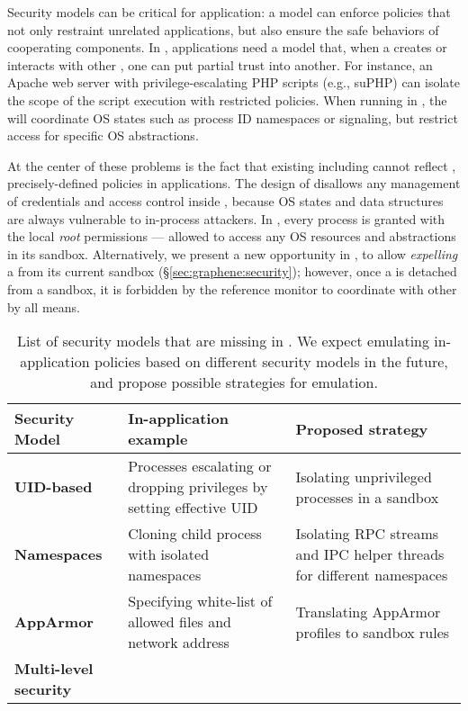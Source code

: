 Security models can be critical for application:
a model can enforce policies that not only restraint unrelated applications,
but also ensure the safe behaviors of cooperating components.
In \liboses{}, applications need a model that,
when a \picoproc{} creates or interacts with other \picoprocs{},
one can put partial trust into another.
For instance,
an Apache web server with privilege-escalating PHP scripts (e.g., suPHP)
can isolate the scope of
the script execution
with restricted policies.
When running in \graphene{},
the \picoprocs{} will coordinate OS states such as process ID namespaces or signaling,
but restrict access for specific OS abstractions. 




At the center of these problems is the fact that existing \liboses{} including \graphene{}
cannot reflect ,
precisely-defined policies in applications.
The design of \picoprocs{} disallows any management of credentials and access control inside \liboses{},
because OS states and data structures are always
vulnerable to in-process attackers. %
In \graphene{}, every process is granted with the local \emph{root} permissions
--- allowed to access any OS resources and abstractions
in its sandbox.
Alternatively, we present a new opportunity in \graphene{},
to allow \emph{expelling} a \picoproc{} from its current sandbox (\S\ref{sec:graphene:security});
however, once a \picoproc{} is detached from a sandbox,
it is forbidden by the reference monitor to coordinate with other \picoprocs{}
by all means.


\begin{table}[t]
\footnotesize
\centering
\begin{tabular}{>{\bf}p{1.2in}>{\raggedright\arraybackslash}p{2.4in}>{\raggedright\arraybackslash}p{2.4in}}
\toprule
{\bf Security Model} & {\bf In-application example} & {\bf Proposed strategy} \\
\midrule
UID-based & Processes escalating or dropping privileges by setting effective UID & Isolating unprivileged processes in a sandbox \\
\midrule
Namespaces & Cloning child process with isolated namespaces & Isolating RPC streams and IPC helper threads for different namespaces \\
\midrule
AppArmor & Specifying white-list of allowed files and network address & Translating AppArmor profiles to sandbox rules \\
\midrule
Multi-level security &  &  \\
\bottomrule
\end{tabular}
\caption[List of security models to be added in \graphene{} as future works]
{List of security models that are missing in \graphene{}.
We expect emulating in-application policies based on different security models in the future, and propose possible strategies for emulation.
}
\label{tab:future:security}
\end{table}

